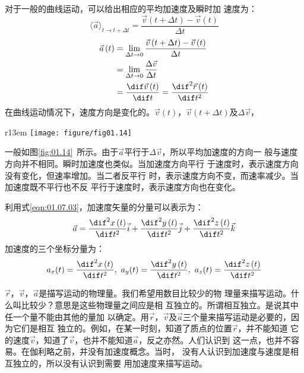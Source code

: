 \documentclass[../outline-of-mechanics.tex]{subfiles}
\begin{document}
对于一般的曲线运动，可以给出相应的平均加速度及瞬时加
速度为：
\begin{equation}\label{eqn:01.08.02}
  \langle \vec{a} \rangle_{t \rightarrow t+\Delta t} = \frac{\vec{v}\left(t+\Delta t\right)-\vec{v}\left(t\right)}{\Delta t}
\end{equation}
\begin{equation}\label{eqn:01.08.03}
  \begin{aligned}
    \vec{a}\left(t\right) & =\lim _{\Delta t \rightarrow 0} \frac{\vec{v}\left(t+\Delta t\right)-\vec{v}\left(t\right)}{\Delta t} \\
                          & =\lim_{\Delta t \rightarrow 0}\frac{\Delta \vec{v}}{\Delta t}                                         \\
                          & =\frac{\dif\vec{v}\left(t\right)}{\dif t}=\frac{\dif^2 \vec{r}\left(t\right)}{\dif t^2}
  \end{aligned}
\end{equation}
在曲线运动情况下，速度方向是变化的。$\vec{v}\left(t\right)$，$\vec{v}\left(t+\Delta t\right)$及$\Delta \vec{v}$，
\begin{wrapfigure}[6]{r}{13em}
  \centering
  \small
  \texttt{[image: figure/fig01.14]}
  \caption{加速度的计算}
  \label{fig:01.14}
\end{wrapfigure}
一般如图\ref{fig:01.14}~所示。由于$\vec{a}$平行于$\Delta \vec{v}$，所以平均加速度的方向一
般与速度方向并不相同。瞬时加速度也类似。当加速度方向平行
于速度时，表示速度方向没有变化，但速率增加。当二者反平行
\clearpage\noindent
时，表示速度方向不变，而速率减少。当加速度既不平行也不反
平行于速度时，表示速度方向也在变化。

利用式\eqref{eqn:01.07.03}，加速度矢量的分量可以表示为：
\begin{equation}\label{eqn:01.08.04}
  \vec{a}=\frac{\dif^2x\left(t\right)}{\dif t^2}\vec{i}+\frac{\dif^2y\left(t\right)}{\dif t^2}\vec{j}+\frac{\dif^2z\left(t\right)}{\dif t^2}\vec{k}
\end{equation}
加速度的三个坐标分量为：
\setlength{\mathindent}{4em}
\begin{equation}\label{eqn:01.08.05}
  a_x(t)=\frac{\dif^2x\left(t\right)}{\dif t^2},~ a_y(t)=\frac{\dif^2y\left(t\right)}{\dif t^2},~
  a_z(t)=\frac{\dif^2z\left(t\right)}{\dif t^2}
\end{equation}
\setlength{\mathindent}{6em}

$\vec{r}$，$\vec{v}$，$\vec{a}$是描写运动的物理量。我们希望用数目比较少的物
理量来描写运动。什么叫比较少？意思是这些物理量之间应是相
互独立的。所谓相互独立。是说其中任一个量不能由其他的量加
以确定。用$\vec{r}$，$\vec{v}$及$\vec{a}$三个量来描写运动是必要的，因为它们是相互
独立的。例如，在某一时刻，知道了质点的位置$\vec{r}$，并不能知道
它的速度$\vec{v}$，知道了$\vec{v}$，也并不能知道$\vec{a}$，反之亦然。人们认识到
这一点，也并不容易。在伽利略之前，并没有加速度概念。当时，
没有人认识到加速度与速度是相互独立的，所以没有认识到需要
用加速度来描写运动。
\end{document}
